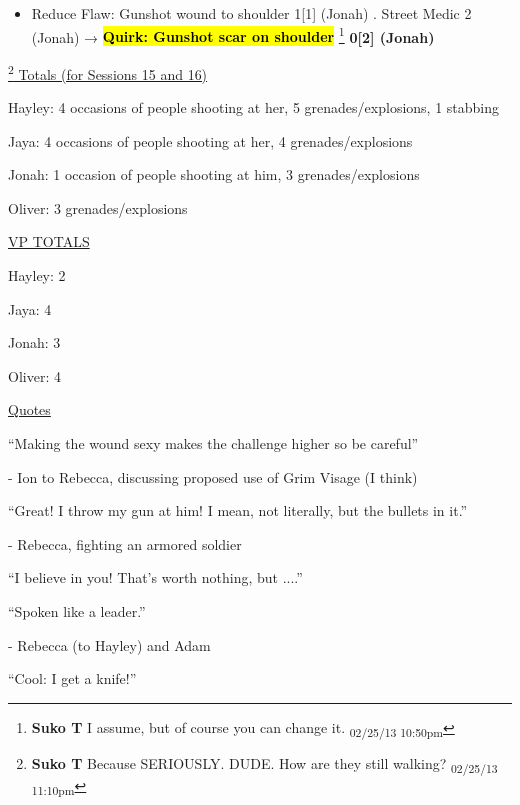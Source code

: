 \begin{itemize}
\item  {\color[RGB]{255,0,0}Reduce Flaw: }  {\color[RGB]{255,0,0}Gunshot wound to shoulder}  {\color[RGB]{255,0,0} 1{[}1{]} (Jonah)} .  Street Medic 2 (Jonah) → \textbf{ {\color[RGB]{255,0,0}\hl{Quirk: Gunshot scar on shoulder}} }\footnote{\textbf{Suko T }I assume, but of course you can change it. \textsubscript{02/25/13 10:50pm}}\textbf{ {\color[RGB]{255,0,0}0{[}2{]} (Jonah)} }
\end{itemize}


\footnote{\textbf{Suko T }Because SERIOUSLY.  DUDE.  How are they still walking? \textsubscript{02/25/13 11:10pm}}\underline{  Totals (for Sessions 15 and 16) }

Hayley: 4 occasions of people shooting at her, 5 grenades/explosions, 1 stabbing

Jaya: 4 occasions of people shooting at her, 4 grenades/explosions

Jonah: 1 occasion of people shooting at him,  3 grenades/explosions

Oliver: 3 grenades/explosions



\underline{  {\LARGE VP TOTALS }  }

Hayley: 2

Jaya: 4

Jonah: 3

Oliver: 4



\underline{  {\LARGE Quotes }  }



``Making the wound sexy makes the challenge higher so be careful''

                                - Ion to Rebecca, discussing proposed use of Grim Visage (I think)



``Great!  I throw my gun at him!  I mean, not literally, but the bullets in it.''

                                - Rebecca, fighting an armored soldier



``I believe in you!  That's worth nothing, but ....''

``Spoken like a leader.''

                                - Rebecca (to Hayley) and Adam



``Cool: I get a knife!''

